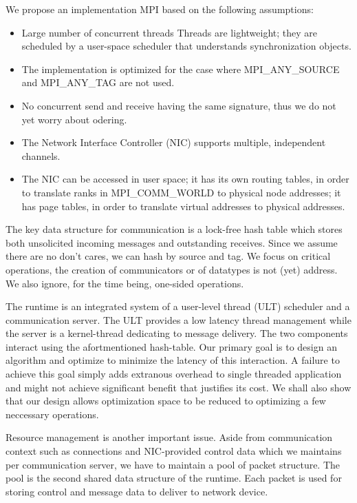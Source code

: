 \documentclass[11pt]{article}
\begin{document}
We propose an implementation MPI based on the following assumptions:
\begin{itemize}
  \item Large number of concurrent threads Threads are lightweight; they are
    scheduled by a user-space scheduler that understands synchronization
    objects.
  \item The implementation is optimized for the case where MPI_ANY_SOURCE and MPI_ANY_TAG are not used.
  \item No concurrent send and receive having the same signature, thus we do not yet worry about odering.
  \item The Network Interface Controller (NIC) supports multiple, independent channels.
  \item The NIC can be accessed in user space; it has its own routing tables,
    in order to translate ranks in MPI\_COMM\_WORLD to physical node addresses;
    it has page tables, in order to translate virtual addresses to physical
    addresses.
\end{itemize}

The key data structure for communication is a lock-free hash table which stores
both unsolicited incoming messages and outstanding receives. Since we assume
there are no don't cares, we can hash by source and tag. We focus on critical
operations, the creation of communicators or of datatypes is not (yet)
address. We also ignore, for the time being, one-sided operations.

The runtime is an integrated system of a user-level thread (ULT) scheduler and
a communication server. The ULT provides a low latency thread management while
the server is a kernel-thread dedicating to message delivery. The two
components interact using the afortmentioned hash-table.  Our primary goal is
to design an algorithm and optimize to minimize the latency of this
interaction. A failure to achieve this goal simply adds extranous overhead to
single threaded application and might not achieve significant benefit that
justifies its cost. We shall also show that our design allows optimization space
to be reduced to optimizing a few neccessary operations.

Resource management is another important issue. Aside from communication
context such as connections and NIC-provided control data which we maintains
per communication server, we have to maintain a pool of packet structure. The
pool is the second shared data structure of the runtime.  Each packet is used
for storing control and message data to deliver to network device.
\end{document}
